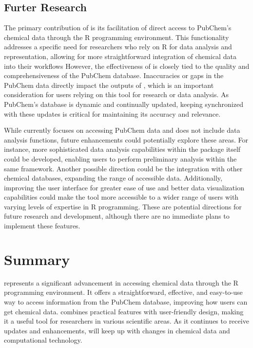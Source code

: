 \hypertarget{furter-research}{%
\subsection{Furter Research}\label{furter-research}}

The primary contribution of  is its facilitation of direct access to PubChem's chemical data through the R programming environment. This functionality addresses a specific need for researchers who rely on R for data analysis and representation, allowing for more straightforward integration of chemical data into their workflows However, the effectiveness of  is closely tied to the quality and comprehensiveness of the PubChem database. Inaccuracies or gaps in the PubChem data directly impact the outputs of , which is an important consideration for users relying on this tool for research or data analysis. As PubChem's database is dynamic and continually updated, keeping  synchronized with these updates is critical for maintaining its accuracy and relevance.

While  currently focuses on accessing PubChem data and does not include data analysis functions, future enhancements could potentially explore these areas. For instance, more sophisticated data analysis capabilities within the package itself could be developed, enabling users to perform preliminary analysis within the same framework. Another possible direction could be the integration with other chemical databases, expanding the range of accessible data. Additionally, improving the user interface for greater ease of use and better data visualization capabilities could make the tool more accessible to a wider range of users with varying levels of expertise in R programming. These are potential directions for future research and development, although there are no immediate plans to implement these features.

\hypertarget{summary}{%
\section{Summary}\label{summary}}

 represents a significant advancement in accessing chemical data through the R programming environment. It offers a straightforward, effective, and easy-to-use way to access information from the PubChem database, improving how users can get chemical data.  combines practical features with user-friendly design, making it a useful tool for researchers in various scientific areas. As it continues to receive updates and enhancements,  will keep up with changes in chemical data and computational technology.

